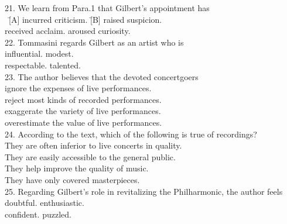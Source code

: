 \begin{tabbing}
21. We learn from Para.1 that Gilbert’s appointment has\\
\hspace{0cm}\ \= [A] incurred criticism. \quad\quad\quad\quad\quad\quad\quad\quad\= [B] raised suspicion.\\
\> [C] received acclaim.
\> [D] aroused curiosity.\\

22. Tommasini regards Gilbert as an artist who is\\
\> [A] influential.
\> [B] modest.\\
\> [C] respectable.
\> [D] talented. \\

23. The author believes that the devoted concertgoers\\
\> [A] ignore the expenses of live performances.\\
\> [B] reject most kinds of recorded performances.\\
\> [C] exaggerate the variety of live performances.\\
\> [D] overestimate the value of live performances.\\

24. According to the text, which of the following is true of recordings?\\
\> [A] They are often inferior to live concerts in quality.\\
\> [B] They are easily accessible to the general public.\\
\> [C] They help improve the quality of music.\\
\> [D] They have only covered masterpieces.\\

25. Regarding Gilbert’s role in revitalizing the Philharmonic, the author feels\\
\> [A] doubtful.
\> [B] enthusiastic.\\
\> [C] confident.
\> [D] puzzled.
\end{tabbing}